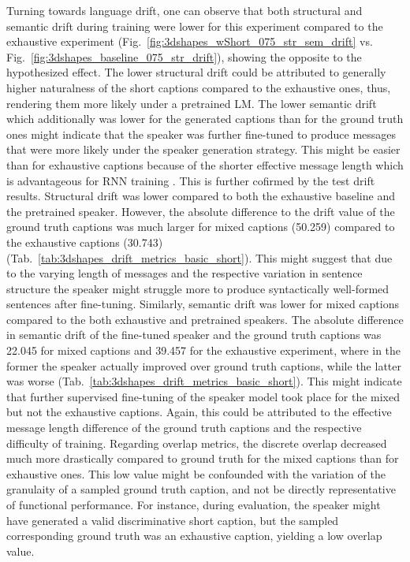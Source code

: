 Turning towards language drift, one can observe that both structural and semantic drift during training were lower for this experiment compared to the exhaustive experiment (Fig.~\ref{fig:3dshapes_wShort_075_str_sem_drift} vs. Fig.~\ref{fig:3dshapes_baseline_075_str_drift}), showing the opposite to the hypothesized effect. The lower structural drift could be attributed to generally higher naturalness of the short captions compared to the exhaustive ones, thus, rendering them more likely under a pretrained LM. The lower semantic drift which additionally was lower for the generated captions than for the ground truth ones might indicate that the speaker was further fine-tuned to produce messages that were more likely under the speaker generation strategy. This might be easier than for exhaustive captions because of the shorter effective message length which is advantageous for RNN training \parencite[cf.][]{jaeger2002tutorial}. This is further cofirmed by the test drift results. Structural drift was lower compared to both the exhaustive baseline and the pretrained speaker. However, the absolute difference to the drift value of the ground truth captions was much larger for mixed captions (50.259) compared to the exhaustive captions (30.743) (Tab.~\ref{tab:3dshapes_drift_metrics_basic_short}). This might suggest that due to the varying length of messages and the respective variation in sentence structure the speaker might struggle more to produce syntactically well-formed sentences after fine-tuning. 
Similarly, semantic drift was lower for mixed captions compared to the both exhaustive and pretrained speakers. The absolute difference in semantic drift of the fine-tuned speaker and the ground truth captions was 22.045 for mixed captions and 39.457 for the exhaustive experiment, where in the former the speaker actually improved over ground truth captions, while the latter was worse (Tab.~\ref{tab:3dshapes_drift_metrics_basic_short}). This might indicate that further supervised fine-tuning of the speaker model took place for the mixed but not the exhaustive captions. Again, this could be attributed to the effective message length difference of the ground truth captions and the respective difficulty of training.
Regarding overlap metrics, the discrete overlap decreased much more drastically compared to ground truth for the mixed captions than for exhaustive ones. This low value might be confounded with the variation of the granulaity of a sampled ground truth caption, and not be directly representative of functional performance. For instance, during evaluation, the speaker might have generated a valid discriminative short caption, but the sampled corresponding ground truth was an exhaustive caption, yielding a low overlap value.   

